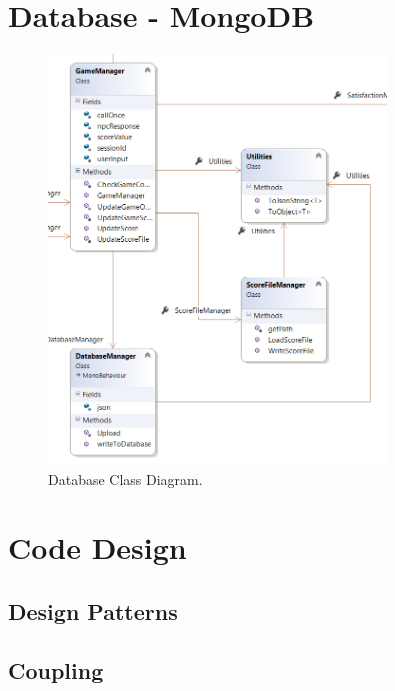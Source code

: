 \section{Database - MongoDB}

\begin{figure}[ht]
	\caption{Database Class Diagram.}
	\label{image:Database}
	\centering
	\includegraphics[width=0.8\textwidth]{Images/ClassDiagram Database.png}
\end{figure}

\section{Code Design}

\subsection{Design Patterns}

\subsection{Coupling}

\subsection{}

